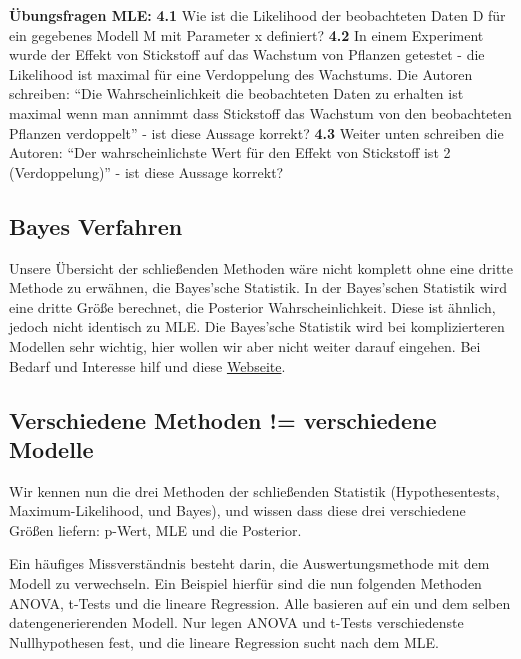 \documentclass[a4paper,twoside]{tufte-book}\usepackage[]{graphicx}\usepackage[]{color}
\begin{document}
\vspace{1cm}
\begin{fullwidth}
\begin{mdframed}[backgroundcolor=black!10,rightline=false,leftline=false]
    
\textbf{Übungsfragen MLE:} 
\textbf{4.1} Wie ist die Likelihood der beobachteten Daten D für ein gegebenes Modell M mit Parameter x definiert?
\textbf{4.2} In einem Experiment wurde der Effekt von Stickstoff auf das Wachstum von Pflanzen getestet - die Likelihood ist maximal für eine Verdoppelung des Wachstums. Die Autoren schreiben: “Die Wahrscheinlichkeit die beobachteten Daten zu erhalten ist maximal wenn man annimmt dass Stickstoff das Wachstum von den beobachteten Pflanzen verdoppelt” - ist diese Aussage korrekt?
\textbf{4.3} Weiter unten schreiben die Autoren: “Der wahrscheinlichste Wert für den Effekt von Stickstoff ist 2 (Verdoppelung)” - ist diese Aussage korrekt?

\end{mdframed}
\end{fullwidth}

\subsection{Bayes Verfahren}

Unsere Übersicht der schließenden Methoden wäre nicht komplett ohne eine dritte Methode zu erwähnen, die Bayes'sche Statistik. In der Bayes'schen Statistik wird eine dritte Größe berechnet, die Posterior Wahrscheinlichkeit. Diese ist ähnlich, jedoch nicht identisch zu MLE. Die Bayes'sche Statistik wird bei komplizierteren Modellen sehr wichtig, hier wollen wir aber nicht weiter darauf eingehen. Bei Bedarf und Interesse hilf \citet{Gelman-BayesianDataAnalysis-2003} und diese \href{http://florianhartig.github.io/LearningBayes/}{Webseite}.

\subsection{Verschiedene Methoden != verschiedene Modelle}

Wir kennen nun die drei Methoden der schließenden Statistik (Hypothesentests, Maximum-Likelihood, und Bayes), und wissen dass diese drei verschiedene Größen liefern: p-Wert, MLE und die Posterior. 

Ein häufiges Missverständnis besteht darin, die Auswertungsmethode mit dem Modell zu verwechseln. Ein Beispiel hierfür sind die nun folgenden Methoden ANOVA, t-Tests und die lineare Regression. Alle basieren auf ein und dem selben datengenerierenden Modell. Nur legen ANOVA und t-Tests verschiedenste Nullhypothesen fest, und die lineare Regression sucht nach dem MLE. 
\end{document}
